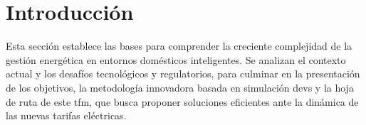 \documentclass[11pt,a4paper]{book}
\begin{document}
\mainmatter

\chapter{Introducción}



%
%
%
%
%
Esta sección establece las bases para comprender la creciente complejidad de la gestión energética en entornos domésticos inteligentes. Se analizan el contexto actual y los desafíos tecnológicos y regulatorios, para culminar en la presentación de los objetivos, la metodología innovadora basada en simulación \gls{devs} y la hoja de ruta de este \gls{tfm}, que busca proponer soluciones eficientes ante la dinámica de las nuevas tarifas eléctricas.
\end{document}

